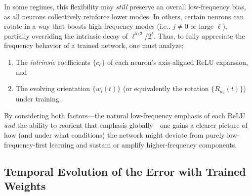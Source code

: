 \documentclass[review,onefignum,onetabnum,onealgnum]{siamart250106}
\numberwithin{theorem}{section}
\begin{document}
In some regimes, this flexibility may \emph{still} preserve an overall low-frequency bias, as all neurons collectively 
reinforce lower modes.  In others, certain neurons can rotate in a way that boosts high-frequency modes 
(i.e., $j\ne0$ or large $\ell$), partially overriding the intrinsic decay of $\ell^{5/2}/2^\ell$.  
Thus, to fully appreciate the frequency behavior of a trained network, one must analyze:

\begin{enumerate}
\item The \emph{intrinsic} coefficients \(\{c_{\ell}\}\) of each neuron’s axis-aligned ReLU expansion, and
\item The evolving orientation \(\{w_i(t)\}\) (or equivalently the rotation \(\{R_{w_i}(t)\}\)) under training.
\end{enumerate}

By considering both factors---the natural low-frequency emphasis of each ReLU \emph{and} the ability to reorient 
that emphasis globally---one gains a clearer picture of how (and under what conditions) the network might deviate 
from purely low-frequency-first learning and sustain or amplify higher-frequency components.


\subsection{Temporal Evolution of the Error with Trained Weights}
\label{subsec:TemporalEvolutionTrainedWeights}
\end{document}
